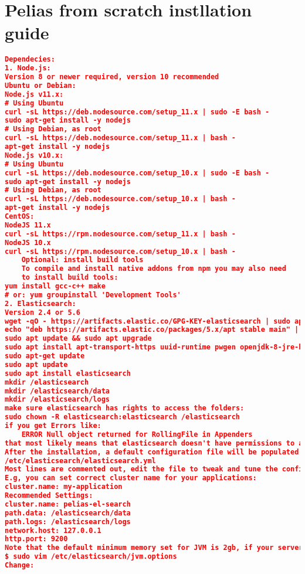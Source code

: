 \section{Pelias from scratch instllation guide} \label{Pfsig}
\begin{lstlisting}[language=json,breaklines=true]
Dependecies:
1. Node.js:
Version 8 or newer required, version 10 recommended 
Ubuntu or Debian:
Node.js v11.x:
# Using Ubuntu
curl -sL https://deb.nodesource.com/setup_11.x | sudo -E bash -
sudo apt-get install -y nodejs
# Using Debian, as root
curl -sL https://deb.nodesource.com/setup_11.x | bash -
apt-get install -y nodejs
Node.js v10.x:
# Using Ubuntu
curl -sL https://deb.nodesource.com/setup_10.x | sudo -E bash -
sudo apt-get install -y nodejs
# Using Debian, as root
curl -sL https://deb.nodesource.com/setup_10.x | bash -
apt-get install -y nodejs
CentOS:
NodeJS 11.x
curl -sL https://rpm.nodesource.com/setup_11.x | bash -
NodeJS 10.x
curl -sL https://rpm.nodesource.com/setup_10.x | bash -
	Optional: install build tools
	To compile and install native addons from npm you may also need 
	to install build tools:
yum install gcc-c++ make
# or: yum groupinstall 'Development Tools'
2. Elasticsearch:
Version 2.4 or 5.6
wget -qO - https://artifacts.elastic.co/GPG-KEY-elasticsearch | sudo apt-key add -
echo "deb https://artifacts.elastic.co/packages/5.x/apt stable main" | sudo tee -a /etc/apt/sources.list.d/elastic-5.x.list
sudo apt update && sudo apt upgrade
sudo apt install apt-transport-https uuid-runtime pwgen openjdk-8-jre-headless
sudo apt-get update
sudo apt update
sudo apt install elasticsearch
mkdir /elasticsearch
mkdir /elasticsearch/data
mkdir /elasticsearch/logs
make sure elasticsearch has rights to access the folders:
sudo chown -R elasticsearch:elasticsearch /elasticsearch
if you get Errors like:
	ERROR Null object returned for RollingFile in Appenders
that most likely means that elasticsearch doesn't have permissions to access the logs and data folders.
After the installation, a default configuration file will be populated to 
/etc/elasticsearch/elasticsearch.yml
Most lines are commented out, edit the file to tweak and tune the configuration.
E.g, you can set correct cluster name for your applications:
cluster.name: my-application
Recommended Settings:
cluster.name: pelias-el-search
path.data: /elasticsearch/data
path.logs: /elasticsearch/logs
network.host: 127.0.0.1
http.port: 9200
Note that the default minimum memory set for JVM is 2gb, if your server has small memory size, change this value:
$ sudo vim /etc/elasticsearch/jvm.options
Change:

\end{lstlisting}
